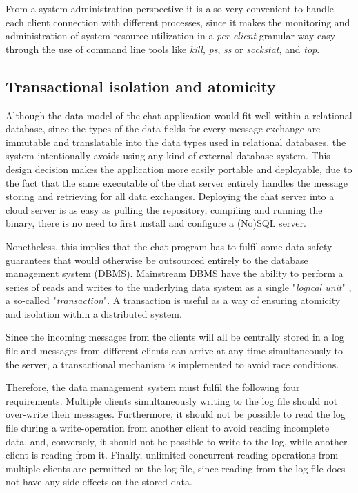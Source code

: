  From a system administration perspective it is also very convenient to handle each client connection with different processes, since it makes the monitoring and administration of system resource utilization in a \textit{per-client} granular way easy through the use of command line tools like \textit{kill}, \textit{ps}, \textit{ss} or \textit{sockstat}, and \textit{top}.

\subsection{Transactional isolation and atomicity}
Although the data model of the chat application would fit well within a relational database, since the types of the data fields for every message exchange are immutable and translatable into the data types used in relational databases, the system intentionally avoids using any kind of external database system. This design decision makes the application more easily portable and deployable, due to the fact that the same executable of the chat server entirely handles the message storing and retrieving for all data exchanges. Deploying the chat server into a cloud server is as easy as pulling the repository, compiling and running the binary, there is no need to first install and configure a (No)SQL server.

Nonetheless, this implies that the chat program has to fulfil some data safety guarantees that would otherwise be outsourced entirely to the database management system (DBMS). Mainstream DBMS have the ability to perform a series of reads and writes to the underlying data system as a single "\textit{logical unit}" \cite{Kleppmann2017}, a so-called "\textit{transaction}". A transaction is useful as a way of ensuring atomicity and isolation within a distributed system.

Since the incoming messages from the clients will all be centrally stored in a log file and messages from different clients can arrive at any time simultaneously to the server, a transactional mechanism is implemented to avoid race conditions. 

Therefore, the data management system must fulfil the following four requirements. Multiple clients simultaneously writing to the log file should not over-write their messages. Furthermore, it should not be possible to read the log file during a write-operation from another client to avoid reading incomplete data, and, conversely, it should not be possible to write to the log, while another client is reading from it. Finally, unlimited concurrent reading operations from multiple clients are permitted on the log file, since reading from the log file does not have any side effects on the stored data.

